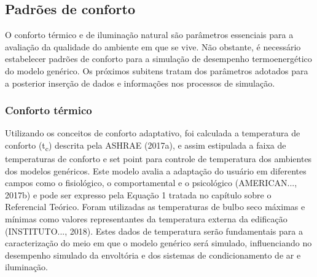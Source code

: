\subsection{Padrões de conforto}
O conforto térmico e de iluminação natural são parâmetros essenciais para a avaliação 
da qualidade do ambiente em que se vive. Não obstante, é necessário estabelecer padrões 
de conforto para a simulação de desempenho termoenergético do modelo genérico. Os 
próximos subitens tratam dos parâmetros adotados para a posterior inserção de dados 
e informações nos processos de simulação.
\subsubsection{Conforto térmico}
Utilizando os conceitos de conforto adaptativo, foi calculada a temperatura de conforto (t\textsubscript{c}) 
descrita pela ASHRAE (2017a), e assim estipulada a faixa de temperaturas de conforto e 
set point para controle de temperatura dos ambientes dos modelos genéricos. Este modelo 
avalia a adaptação do usuário em diferentes campos como o fisiológico, o comportamental 
e o psicológico (AMERICAN..., 2017b) e pode ser expresso pela Equação 1 tratada no capítulo sobre o Referencial Teórico.\vspace*{0.3cm} \newline
Foram utilizadas as temperaturas de bulbo seco máximas e mínimas como valores representantes 
da temperatura externa da edificação (INSTITUTO..., 2018). Estes dados de temperatura serão 
fundamentais para a caracterização do meio em que o modelo genérico será simulado, 
influenciando no desempenho simulado da envoltória e dos sistemas de condicionamento de ar 
e iluminação.
